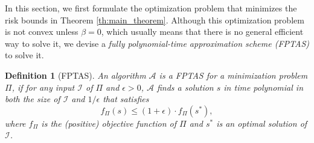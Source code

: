 \documentclass[letterpaper]{article} %
\newtheorem{definition}{Definition}
\newcommand{\red}[1]{\textcolor{red}{#1}}
\newcommand{\todo}[1]{\red{\textsc{todo:} #1}}
\begin{document}
In this section, we first formulate the optimization problem that minimizes the risk bounds in Theorem \ref{th:main_theorem}. 
Although this optimization problem is not convex unless $\beta=0$, which usually means that there is no general efficient way to solve it, we devise a \emph{fully polynomial-time approximation scheme (FPTAS)} to solve it.
\begin{definition}[FPTAS]
  An algorithm $\mathcal{A}$ is a FPTAS for a minimization problem $\Pi$, if for any input $\mathcal{I}$ of $\Pi$ and $\epsilon>0$, $\mathcal{A}$ finds a solution $s$ in time polynomial in both the size of $\mathcal{I}$ and $1/\epsilon$ that satisfies
  \[f_\Pi(s)\le (1+\epsilon) \cdot f_\Pi(s^*),\]
  where $f_\Pi$ is the (positive) objective function of $\Pi$ and $s^*$ is an optimal solution of $\mathcal{I}$.
\end{definition}
\end{document}
